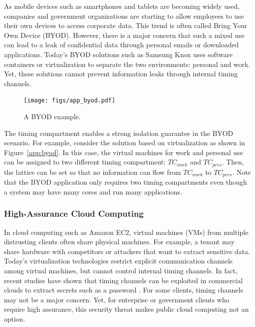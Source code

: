 As mobile devices such as smartphones and tablets are becoming widely used, 
companies and government organizations are starting to allow employees to
use their own devices to access corporate data. This trend is often called
Bring Your Own Device (BYOD). However, there is a major concern that such a
mixed use can lead to a leak of confidential data through personal emails or
downloaded applications. Today's BYOD solutions such as Samsung Knox uses
software containers or virtualization to separate the two environments:
personal and work. Yet, these solutions cannot prevent information leaks
through internal timing channels.

\begin{figure}
    \begin{center}
        \texttt{[image: figs/app\_byod.pdf]}
        \caption{A BYOD example.}
        \label{fig:app_byod}
    \end{center}
\end{figure}

The timing compartment enables a strong isolation guarantee in the BYOD
scenario. For example, consider the solution based on virtualization as 
shown in Figure~\ref{app:byod}. In this case, the virtual machines for
work and personal use can be assigned to two different timing compartment:
$TC_{work}$ and $TC_{pers}$. Then, the lattice can be set so that no
information can flow from $TC_{work}$ to $TC_{pers}$.
Note that the BYOD application only requires two timing compartments even
though a system may have many cores and run many applications.

\subsubsection{High-Assurance Cloud Computing}

In cloud computing such as Amazon EC2, virtual machines (VMs) from multiple
distrusting clients often share physical machines. 
For example, a tenant may share hardware with competitors or attackers that 
want to extract sensitive data. Today's virtualization technologies restrict 
explicit communication channels among virtual machines, but cannot control 
internal timing channels. In fact, recent studies have shown that timing channels
can be exploited in commercial clouds to extract secrets such as 
a password \cite{heyyou}.
For some clients, timing channels may not be a major concern. Yet, for enterprise
or government clients who require high assurance, this security threat makes
public cloud computing not an option. 

